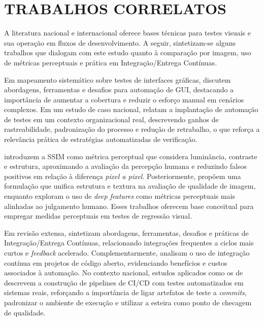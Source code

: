 \documentclass{UNESC}
\begin{document}
\section{TRABALHOS CORRELATOS}

A literatura nacional e internacional oferece bases técnicas para testes visuais e sua operação em fluxos de desenvolvimento. A seguir, sintetizam-se alguns trabalhos que dialogam com este estudo quanto à comparação por imagem, uso de métricas perceptuais e prática em Integração/Entrega Contínuas.

Em mapeamento sistemático sobre testes de interfaces gráficas,  discutem abordagens, ferramentas e desafios para automação de GUI, destacando a importância de aumentar a cobertura e reduzir o esforço manual em cenários complexos. Em um estudo de caso nacional,  relatam a implantação de automação de testes em um contexto organizacional real, descrevendo ganhos de rastreabilidade, padronização do processo e redução de retrabalho, o que reforça a relevância prática de estratégias automatizadas de verificação.

 introduzem a SSIM como métrica perceptual que considera luminância, contraste e estrutura, aproximando a avaliação da percepção humana e reduzindo falsos positivos em relação à diferença \emph{pixel a pixel}. Posteriormente,  propõem uma formulação que unifica estrutura e textura na avaliação de qualidade de imagem, enquanto  exploram o uso de \emph{deep features} como métricas perceptuais mais alinhadas ao julgamento humano. Esses trabalhos oferecem base conceitual para empregar medidas perceptuais em testes de regressão visual.

Em revisão extensa,  sintetizam abordagens, ferramentas, desafios e práticas de Integração/Entrega Contínuas, relacionando integrações frequentes a ciclos mais curtos e \emph{feedback} acelerado. Complementarmente,  analisam o uso de integração contínua em projetos de código aberto, evidenciando benefícios e custos associados à automação. No contexto nacional, estudos aplicados como os de  descrevem a construção de pipelines de CI/CD com testes automatizados em sistemas reais, reforçando a importância de ligar artefatos de teste a \emph{commits}, padronizar o ambiente de execução e utilizar a esteira como ponto de checagem de qualidade.
\end{document}

